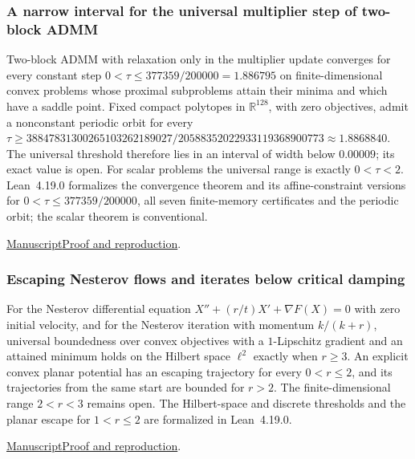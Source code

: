 \documentclass[11pt,a4paper]{article}
\begin{document}
\subsubsection{A narrow interval for the universal multiplier step of two-block ADMM}

Two-block ADMM with relaxation only in the multiplier update converges for every constant step $0<\tau\le 377359/200000=1.886795$ on finite-dimensional convex problems whose proximal subproblems attain their minima and which have a saddle point. Fixed compact polytopes in $\mathbb R^{128}$, with zero objectives, admit a nonconstant periodic orbit for every $\tau\ge 38847831300265103262189027/20588352022933119368900773\approx1.8868840$. The universal threshold therefore lies in an interval of width below $0.00009$; its exact value is open. For scalar problems the universal range is exactly $0<\tau<2$. Lean~4.19.0 formalizes the convergence theorem and its affine-constraint versions for $0<\tau\le377359/200000$, all seven finite-memory certificates and the periodic orbit; the scalar theorem is conventional.

\href{https://github.com/dvgyl/math-and-theory/blob/main/papers/mathematics/admm-multiplier-step/manuscript.pdf}{Manuscript}\quad\href{https://github.com/dvgyl/math-and-theory/blob/main/papers/mathematics/admm-multiplier-step/README.md}{Proof and reproduction}.

\subsubsection{Escaping Nesterov flows and iterates below critical damping}

For the Nesterov differential equation $X''+(r/t)X'+\nabla F(X)=0$ with zero initial velocity, and for the Nesterov iteration with momentum $k/(k+r)$, universal boundedness over convex objectives with a $1$-Lipschitz gradient and an attained minimum holds on the Hilbert space $\ell^2$ exactly when $r\ge3$. An explicit convex planar potential has an escaping trajectory for every $0<r\le2$, and its trajectories from the same start are bounded for $r>2$. The finite-dimensional range $2<r<3$ remains open. The Hilbert-space and discrete thresholds and the planar escape for $1<r\le2$ are formalized in Lean~4.19.0.

\href{https://github.com/dvgyl/math-and-theory/blob/main/papers/mathematics/nesterov-subcritical/manuscript.pdf}{Manuscript}\quad\href{https://github.com/dvgyl/math-and-theory/blob/main/papers/mathematics/nesterov-subcritical/README.md}{Proof and reproduction}.
\end{document}
